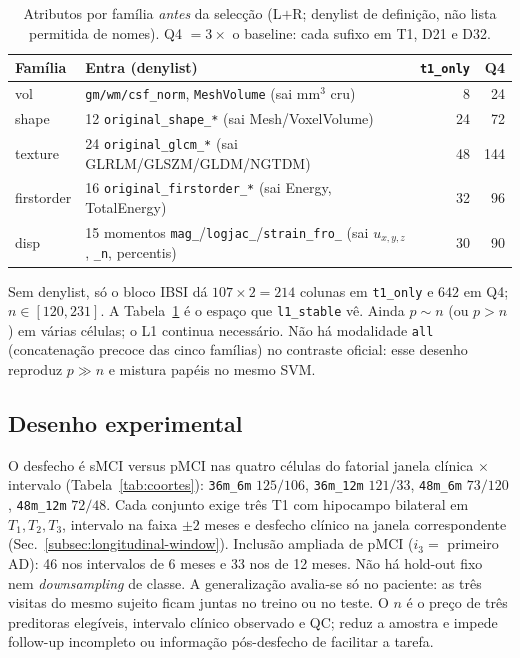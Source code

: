 \documentclass[review]{elsarticle}
\newcommand{\code}[1]{\texttt{#1}}
\begin{document}
		\begin{table}[htbp]
			\centering
			\caption{Atributos por família \emph{antes} da selecção (L$+$R; denylist de definição, não lista permitida de nomes).
			Q4 $=3\times$ o baseline: cada sufixo em T1, D21 e D32.}
			\label{tab:dims}
				\begin{tabular}{llrr}
					\toprule
					Família & Entra (denylist) & \code{t1\_only} & Q4 \\
					\midrule
					vol & \code{gm/wm/csf\_norm}, \code{MeshVolume} (sai mm$^3$ cru) & 8 & 24 \\
					shape & 12 \code{original\_shape\_*} (sai Mesh/VoxelVolume) & 24 & 72 \\
					texture & 24 \code{original\_glcm\_*} (sai GLRLM/GLSZM/GLDM/NGTDM) & 48 & 144 \\
					firstorder & 16 \code{original\_firstorder\_*} (sai Energy, TotalEnergy) & 32 & 96 \\
					disp & 15 momentos \code{mag\_}/\code{logjac\_}/\code{strain\_fro\_} (sai $u_{x,y,z}$, \code{\_n}, percentis) & 30 & 90 \\
					\bottomrule
				\end{tabular}
		\end{table}
		
		Sem denylist, só o bloco IBSI dá $107\times 2=214$ colunas em \code{t1\_only} e $642$ em Q4; $n\in[120,231]$.
		A Tabela~\ref{tab:dims} é o espaço que \code{l1\_stable} vê.
		Ainda $p\sim n$ (ou $p>n$) em várias células; o L1 continua necessário.
		Não há modalidade \code{all} (concatenação precoce das cinco famílias) no contraste oficial: esse desenho reproduz $p\gg n$ e mistura papéis no mesmo SVM.

	\subsection{Desenho experimental}\label{sec:experiments}

		O desfecho é sMCI versus pMCI nas quatro células do fatorial janela clínica $\times$ intervalo (Tabela~\ref{tab:coortes}): \code{36m\_6m} $125/106$, \code{36m\_12m} $121/33$, \code{48m\_6m} $73/120$, \code{48m\_12m} $72/48$.
		Cada conjunto exige três T1 com hipocampo bilateral em $T_1,T_2,T_3$, intervalo na faixa $\pm 2$ meses e desfecho clínico na janela correspondente (Sec.~\ref{subsec:longitudinal-window}).
		Inclusão ampliada de pMCI ($i_3=$ primeiro AD): 46 nos intervalos de 6 meses e 33 nos de 12 meses.
		Não há hold-out fixo nem \emph{downsampling} de classe.
		A generalização avalia-se só no paciente: as três visitas do mesmo sujeito ficam juntas no treino ou no teste.
		O $n$ é o preço de três preditoras elegíveis, intervalo clínico observado e QC; reduz a amostra e impede follow-up incompleto ou informação pós-desfecho de facilitar a tarefa.
		
\end{document}
